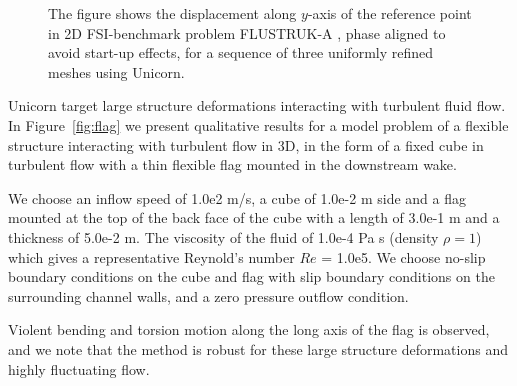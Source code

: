 \begin{figure}[!ht]
\caption{
The figure shows the displacement along $y$-axis of the reference point in 2D FSI-benchmark problem FLUSTRUK-A  \citep{HoffmanJanssonStockli2011}, phase aligned to avoid start-up effects, for a sequence of three uniformly refined meshes using Unicorn.
}
\label{fig:flustruk}
\end{figure}

Unicorn target large structure deformations interacting with turbulent fluid flow. In Figure~\ref{fig:flag} we present qualitative results for a model problem of a flexible structure interacting
with turbulent flow in 3D, in the form of a fixed cube in turbulent flow with a thin flexible flag mounted in the downstream wake.

We choose an inflow speed of 1.0e2 m/s, a cube of 1.0e-2 m side and a flag mounted at the top of the back face of the cube with a length of 3.0e-1 m and a thickness of 5.0e-2 m. The viscosity of the fluid of 1.0e-4 Pa s (density $\rho=1$) which gives a representative Reynold's number $Re$ = 1.0e5. We choose no-slip boundary conditions on the cube and flag with slip boundary conditions on the surrounding channel walls, and a zero pressure outflow condition.

Violent bending and torsion motion along the long axis of the flag is observed, and we note that the
method is robust for these large structure deformations and highly fluctuating flow.

